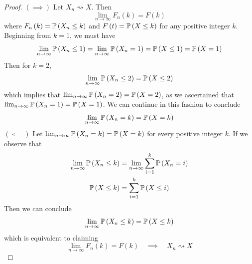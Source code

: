 \documentclass[a4paper]{article}
\begin{document}
\begin{proof}[Proof] 
\(\left( \implies \right)\) Let \(X_{n} \rightsquigarrow X\). Then
\[
	\lim_{n \to \infty} F_{n}\left( k \right) = F\left( k \right)
\]
where \(F_{n}\left( k \right) = \mathbb{P}\left( X_{n} \le k \right)\) and \(F \left( t \right) = \mathbb{P}\left( X \le k \right)\) for any positive integer \(k\). Beginning from \(k = 1\), we must have
\[
	\lim_{n \to \infty} \mathbb{P}\left( X_{n} \le 1 \right) = \lim_{n \to \infty} \mathbb{P}\left( X_{n} = 1 \right) = \mathbb{P}\left( X \le 1 \right) = \mathbb{P}\left( X = 1 \right)
\]
Then for \(k=2\),
\[
	\lim_{n \to \infty} \mathbb{P}\left( X_{n} \le 2 \right) = \mathbb{P}\left( X \le 2 \right)
\]
which implies that \(\lim_{n \to \infty} \mathbb{P}\left( X_{n} = 2 \right) = \mathbb{P}\left( X = 2 \right)\), as we ascertained that \(\lim_{n \to \infty} \mathbb{P}\left( X_{n} = 1 \right) = \mathbb{P}\left( X = 1 \right)\). We can continue in this fashion to conclude
\[
	\lim_{n \to \infty} \mathbb{P}\left( X_{n} = k \right) = \mathbb{P}\left( X = k \right)
\]
\(\left( \impliedby \right) \) Let \(\lim_{n \to \infty} \mathbb{P}\left( X_{n} = k \right) = \mathbb{P}\left( X = k \right)\) for every positive integer \(k\). If we observe that
\begin{align*}
	\lim_{n \to \infty} \mathbb{P}\left( X_{n} \le k \right) & = \lim_{n \to \infty} \sum_{i=1}^{k} \mathbb{P}\left( X_{n} = i \right) \\
	\mathbb{P}\left( X \le k \right) & = \sum_{i=1}^{k} \mathbb{P}\left( X \le i \right) \\ 
\end{align*}
Then we can conclude
\[
	\lim_{n \to \infty} \mathbb{P}\left( X_{n} \le k \right) = \mathbb{P}\left( X \le k \right)
\]
which is equivalent to claiming
\[
	\lim_{n \to \infty} F_{n}\left( k \right) = F \left( k \right) \quad \implies \quad X_{n} \rightsquigarrow X
\]
\end{proof}

\end{document}
